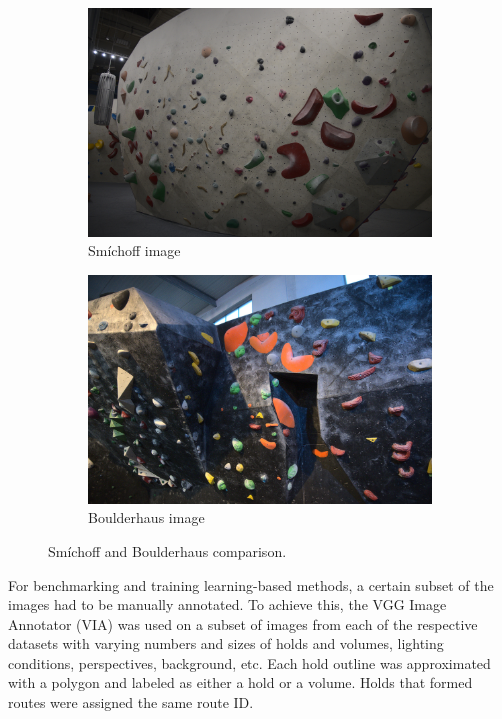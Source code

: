 \documentclass[final]{cvpr}
\begin{document}
\begin{figure}[h]
\centering
\begin{subfigure}{0.49\linewidth}
\centering
\includegraphics[width = \linewidth]{img/sm.jpg}
\caption{Smíchoff image}
\end{subfigure}
\begin{subfigure}{0.49\linewidth}
\centering
\includegraphics[width = \linewidth]{img/bh.jpg}
\caption{Boulderhaus image}
\end{subfigure}
\caption{Smíchoff and Boulderhaus comparison.}
\label{fig:sm-v-bg}
\end{figure}

For benchmarking and training learning-based methods, a certain subset of the images had to be manually annotated.
To achieve this, the VGG Image Annotator (VIA) \cite{dutta2016via,dutta2019vgg} was used on a subset of images from each of the respective datasets with varying numbers and sizes of holds and volumes, lighting conditions, perspectives, background, etc.
Each hold outline was approximated with a polygon and labeled as either a hold or a volume.
Holds that formed routes were assigned the same route ID.
\end{document}

